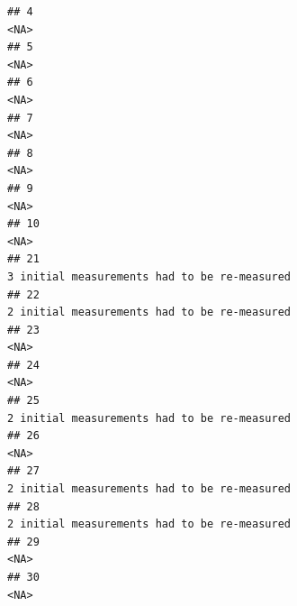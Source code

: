 \documentclass[]{article}
\begin{document}
\begin{verbatim}
## 4                                                                                                                                                  <NA>
## 5                                                                                                                                                  <NA>
## 6                                                                                                                                                  <NA>
## 7                                                                                                                                                  <NA>
## 8                                                                                                                                                  <NA>
## 9                                                                                                                                                  <NA>
## 10                                                                                                                                                 <NA>
## 21                                                                                                         3 initial measurements had to be re-measured
## 22                                                                                                         2 initial measurements had to be re-measured
## 23                                                                                                                                                 <NA>
## 24                                                                                                                                                 <NA>
## 25                                                                                                         2 initial measurements had to be re-measured
## 26                                                                                                                                                 <NA>
## 27                                                                                                         2 initial measurements had to be re-measured
## 28                                                                                                         2 initial measurements had to be re-measured
## 29                                                                                                                                                 <NA>
## 30                                                                                                                                                 <NA>

\end{verbatim}
\end{document}
